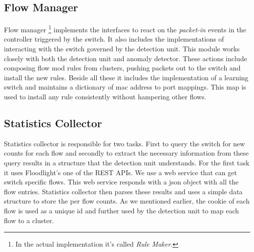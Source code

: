\documentclass[twocolumn]{article}
\begin{document}
\subsection{Flow Manager}
Flow manager \footnote{In the actual implementation it's called \emph{Rule Maker}.} implements the interfaces to react on the \emph{packet-in} events in the controller triggered by the switch. It also includes the implementations of interacting with the switch governed by the detection unit.  This module works closely with both the detection unit and anomaly detector. These actions include composing flow mod rules from clusters, pushing packets out to the switch and install the new rules. Beside all these it includes the implementation of a learning switch and maintains a dictionary of mac address to port mappings. This map is used to install any rule consistently without hampering other flows.

\subsection{Statistics Collector}
Statistics collector is responsible for two tasks. First to query the switch for new counts for each flow and secondly to extract the necessary information from these query results in a structure that the detection unit understands. For the first task it uses Floodlight's one of the REST APIs. We use a web service that can get switch specific flows. This web service responds with a json object with all the flow entries. Statistics collector then parses these results and uses a simple data structure to store the per flow counts. As we mentioned earlier, the cookie of each flow is used as a unique id and further used by the detection unit to map each flow to a cluster.
\end{document}
